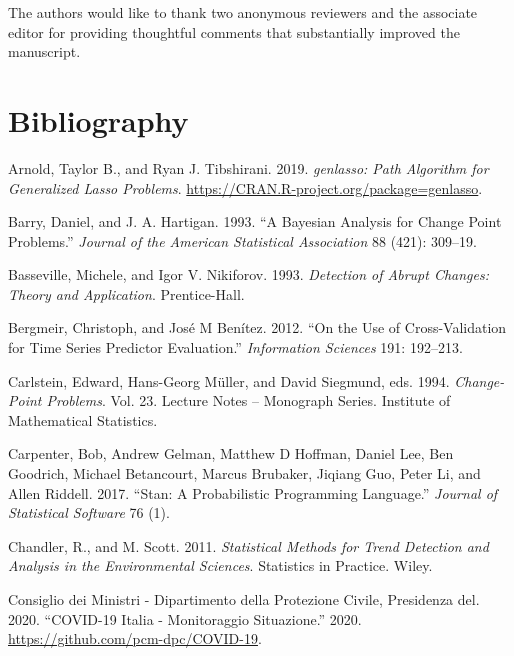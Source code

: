 \documentclass[
  11pt,
]{article}
\theoremstyle{nonumberplain}
\begin{document}
The authors would like to thank two anonymous reviewers and the
associate editor for providing thoughtful comments that substantially
improved the manuscript.

\hypertarget{bibliography}{%
\section*{Bibliography}\label{bibliography}}

\hypertarget{refs}{}
\leavevmode\hypertarget{ref-genlasso}{}%
Arnold, Taylor B., and Ryan J. Tibshirani. 2019. \emph{genlasso: Path
Algorithm for Generalized Lasso Problems}.
\url{https://CRAN.R-project.org/package=genlasso}.

\leavevmode\hypertarget{ref-barry1993bayesianchangepoint}{}%
Barry, Daniel, and J. A. Hartigan. 1993. ``A Bayesian Analysis for
Change Point Problems.'' \emph{Journal of the American Statistical
Association} 88 (421): 309--19.

\leavevmode\hypertarget{ref-bassemand1993abrupt}{}%
Basseville, Michele, and Igor V. Nikiforov. 1993. \emph{Detection of
Abrupt Changes: Theory and Application}. Prentice-Hall.

\leavevmode\hypertarget{ref-bergmeir2012use}{}%
Bergmeir, Christoph, and José M Benítez. 2012. ``On the Use of
Cross-Validation for Time Series Predictor Evaluation.''
\emph{Information Sciences} 191: 192--213.

\leavevmode\hypertarget{ref-carlstein1994change}{}%
Carlstein, Edward, Hans-Georg Müller, and David Siegmund, eds. 1994.
\emph{Change-Point Problems}. Vol. 23. Lecture Notes -- Monograph
Series. Institute of Mathematical Statistics.

\leavevmode\hypertarget{ref-carpenter2017stan}{}%
Carpenter, Bob, Andrew Gelman, Matthew D Hoffman, Daniel Lee, Ben
Goodrich, Michael Betancourt, Marcus Brubaker, Jiqiang Guo, Peter Li,
and Allen Riddell. 2017. ``Stan: A Probabilistic Programming Language.''
\emph{Journal of Statistical Software} 76 (1).

\leavevmode\hypertarget{ref-chandler2011statistical}{}%
Chandler, R., and M. Scott. 2011. \emph{Statistical Methods for Trend
Detection and Analysis in the Environmental Sciences}. Statistics in
Practice. Wiley.

\leavevmode\hypertarget{ref-italianCOVID19}{}%
Consiglio dei Ministri - Dipartimento della Protezione Civile,
Presidenza del. 2020. ``COVID-19 Italia - Monitoraggio Situazione.''
2020. \url{https://github.com/pcm-dpc/COVID-19}.
\end{document}
